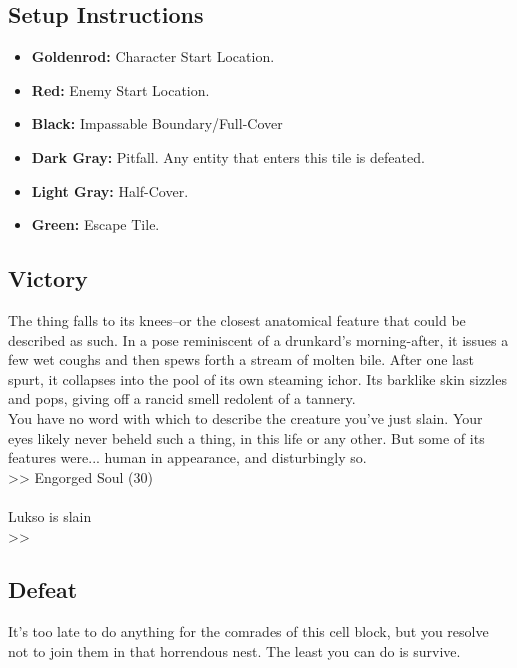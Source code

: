 \subsection*{Setup Instructions}
\begin{itemize}
\item \textbf{Goldenrod:} Character Start Location.
\item \textbf{Red:} Enemy Start Location.
\item \textbf{Black:} Impassable Boundary/Full-Cover
\item \textbf{Dark Gray:} Pitfall. Any entity that enters this tile is defeated.
\item \textbf{Light Gray:} Half-Cover.
\item \textbf{Green:} Escape Tile.
\end{itemize}

\pagebreak

\subsection*{Victory}
The thing falls to its knees--or the closest anatomical feature that could be described as such. In a pose reminiscent of a drunkard’s morning-after, it issues a few wet coughs and then spews forth a stream of molten bile. After one last spurt, it collapses into the pool of its own steaming ichor. Its barklike skin sizzles and pops, giving off a rancid smell redolent of a tannery.\\

You have no word with which to describe the creature you’ve just slain. Your eyes likely never beheld such a thing, in this life or any other. But some of its features were... human in appearance, and disturbingly so.\\

>> Engorged Soul (30)\\
\\
 Lukso is slain\\
>> 

\subsection*{Defeat}

It's too late to do anything for the comrades of this cell block, but you resolve not to join them in that horrendous nest. The least you can do is survive.\\

